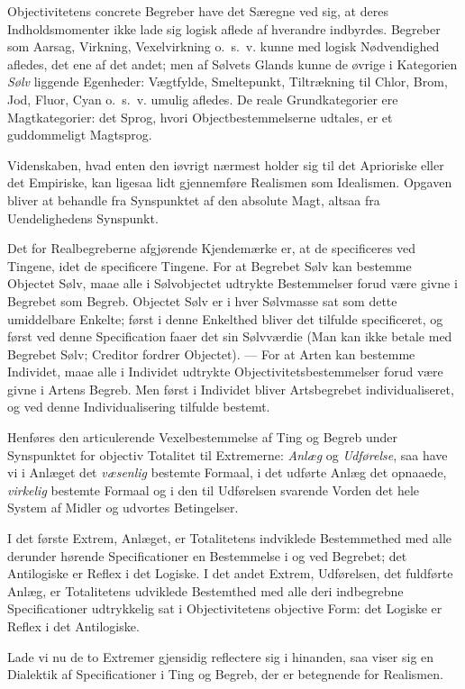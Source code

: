 \documentclass[12pt]{book}
\newcommand{\opage}[1]{\marginnote{\footnotesize\textit{[#1]}}}
\begin{document}
Objectivitetens concrete Begreber have det Særegne ved sig, at deres
Indholdsmomenter ikke lade sig logisk aflede af hverandre indbyrdes.
Begreber som Aarsag, Virkning, Vexelvirkning o.~s.~v. kunne med
logisk Nødvendighed afledes, det ene af det andet; men af Sølvets
Glands kunne de øvrige i Kategorien \emph{Sølv} liggende Egenheder:
Vægtfylde, Smeltepunkt, Tiltrækning til Chlor, Brom, Jod, Fluor,
Cyan o.~s.~v. umulig afledes. De reale Grundkategorier ere
Magtkategorier: det Sprog, hvori Objectbestemmelserne udtales, er et
guddommeligt Magtsprog.

Videnskaben, hvad enten den iøvrigt nærmest holder sig til det
Aprioriske eller det Empiriske, kan ligesaa lidt gjennemføre
Realismen som Idealismen. Opgaven bliver at behandle fra Synspunktet
af den absolute Magt, altsaa fra Uendelighedens Synspunkt.

\opage{70} Det for Realbegreberne afgjørende Kjendemærke er, at de specificeres
ved Tingene, idet de specificere Tingene. For at Begrebet Sølv kan
bestemme Objectet Sølv, maae alle i Sølvobjectet udtrykte
Bestemmelser forud være givne i Begrebet som Begreb. Objectet Sølv
er i hver Sølvmasse sat som dette umiddelbare Enkelte; først i denne
Enkelthed bliver det tilfulde specificeret, og først ved denne
Specification faaer det sin Sølvværdie (Man kan ikke betale med
Begrebet Sølv; Creditor fordrer Objectet). --- For at Arten kan
bestemme Individet, maae alle i Individet udtrykte
Objectivitetsbestemmelser forud være givne i Artens Begreb. Men
først i Individet bliver Artsbegrebet individualiseret, og ved denne
Individualisering tilfulde bestemt.

Henføres den articulerende Vexelbestemmelse af Ting og Begreb under
Synspunktet for objectiv Totalitet til Extremerne: \emph{Anlæg} og
\emph{Udførelse}, saa have vi i Anlæget det \emph{væsenlig} bestemte
Formaal, i det udførte Anlæg det opnaaede, \emph{virkelig} bestemte
Formaal og i den til Udførelsen svarende Vorden det hele System af
Midler og udvortes Betingelser.

I det første Extrem, Anlæget, er Totalitetens indviklede
Bestemmethed med alle derunder hørende Specificationer en
Bestemmelse i og ved Begrebet; det Antilogiske er Reflex i det
Logiske. I det andet Extrem, Udførelsen, det fuldførte Anlæg, er
Totalitetens udviklede Bestemthed med alle deri indbegrebne
Specificationer udtrykkelig sat i Objectivitetens objective Form:
det Logiske er Reflex i det Antilogiske.

Lade vi nu de to Extremer gjensidig reflectere sig i hinanden, saa
viser sig en Dialektik af Specificationer i Ting og Begreb, der er
betegnende for Realismen.
\end{document}
